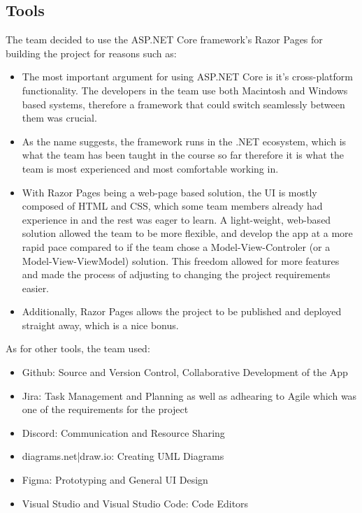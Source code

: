 \documentclass[12pt]{report}
\begin{document}
\subsection*{Tools}
The team decided to use the ASP.NET Core framework's Razor Pages for building the project for reasons such as:
\begin{itemize}
  \item The most important argument for using ASP.NET Core is it's cross-platform functionality. The developers in the team use 
  both Macintosh and Windows based systems, therefore a framework that could switch seamlessly between them was crucial.
  \item As the name suggests, the framework runs in the .NET ecosystem, which is what the team has been taught in the course so far
  therefore it is what the team is most experienced and most comfortable working in.
  \item With Razor Pages being a web-page based solution, the UI is mostly composed of HTML and CSS, which some team members already
  had experience in and the rest was eager to learn. A light-weight, web-based solution allowed the team to be more flexible,
  and develop the app at a more rapid pace compared to if the team chose a Model-View-Controler (or a Model-View-ViewModel) solution.
  This freedom allowed for more features and made the process of adjusting to changing the project requirements easier.
  \item Additionally, Razor Pages allows the project to be published and deployed straight away, which is a nice bonus.
\end{itemize}
As for other tools, the team used:
\begin{itemize}
  \item Github: Source and Version Control, Collaborative Development of the App
  \item Jira: Task Management and Planning as well as adhearing to Agile which was one of the requirements for the project
  \item Discord: Communication and Resource Sharing
  \item diagrams.net|draw.io: Creating UML Diagrams 
  \item Figma: Prototyping and General UI Design
  \item Visual Studio and Visual Studio Code: Code Editors
\end{itemize}
\end{document}
